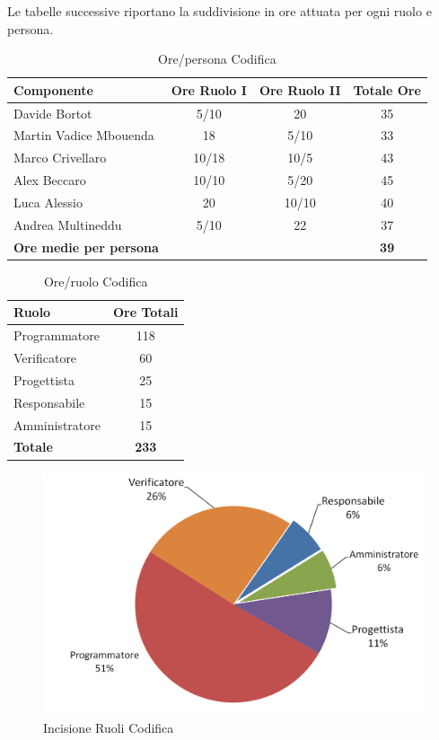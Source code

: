 \documentclass[a4paper,11pt]{article}
\begin{document}
		Le tabelle successive riportano la suddivisione in ore attuata per ogni ruolo e persona.
		\begin{table}[h!]			
		\begin{center}
			\begin{tabular}{l c c c}
			\textbf{Componente} & \textbf{Ore Ruolo I} & \textbf{Ore Ruolo II} & \textbf{Totale Ore}\\
			\midrule
			Davide Bortot & 5/10 & 20 & 35\\
			Martin Vadice Mbouenda & 18 & 5/10 & 33\\
			Marco Crivellaro & 10/18 & 10/5 & 43 \\
			Alex Beccaro & 10/10 & 5/20 & 45\\
			Luca Alessio & 20 & 10/10 & 40\\
			Andrea Multineddu & 5/10 & 22 & 37\\
			\midrule
			\textbf{Ore medie per persona} & & & \textbf{39}\\
			\end{tabular}
		\end{center}
		\caption{Ore/persona Codifica}
		\end{table}
		\begin{table}[h!]			
		\begin{center}
			\begin{tabular}{l c}
			\textbf{Ruolo} & \textbf{Ore Totali} \\
			\midrule
			Programmatore & 118 \\
			Verificatore & 60\\
			Progettista & 25 \\		
			Responsabile & 15\\
			Amministratore & 15 \\
			\midrule
			\textbf{Totale} & \textbf{233}\\
			\end{tabular}
		\end{center}
		\caption{Ore/ruolo Codifica}
		\end{table}
		
		\begin{figure}[h!]
		    \centering
			\includegraphics[scale=0.65]{../Images/pie_chart-Codifica}
			\caption{Incisione Ruoli Codifica}
		\end{figure}
		\clearpage
			
\end{document}
